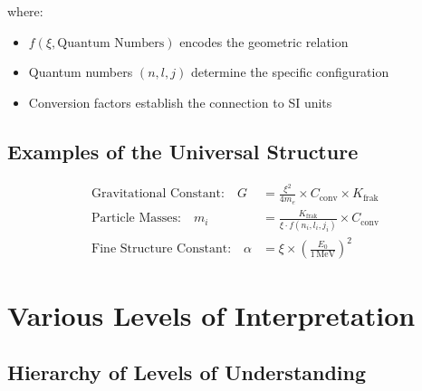 \documentclass[12pt,a4paper]{article}
\newcommand{\xipar}{\xi}
\newcommand{\Kfrak}{K_{\text{frak}}}
\begin{document}
	where:
	\begin{itemize}
		\item $f(\xipar, \text{Quantum Numbers})$ encodes the geometric relation
		\item Quantum numbers $(n,l,j)$ determine the specific configuration
		\item Conversion factors establish the connection to SI units
	\end{itemize}
	
	\subsection{Examples of the Universal Structure}
	
	\begin{align}
		\text{Gravitational Constant:} \quad G &= \frac{\xipar^2}{4m_e} \times C_{\text{conv}} \times \Kfrak \\
		\text{Particle Masses:} \quad m_i &= \frac{\Kfrak}{\xipar \cdot f(n_i,l_i,j_i)} \times C_{\text{conv}} \\
		\text{Fine Structure Constant:} \quad \alpha &= \xipar \times \left(\frac{E_0}{1\,\si{\mega\electronvolt}}\right)^2
	\end{align}
	
	\section{Various Levels of Interpretation}
	
	\subsection{Hierarchy of Levels of Understanding}
	
\end{document}
